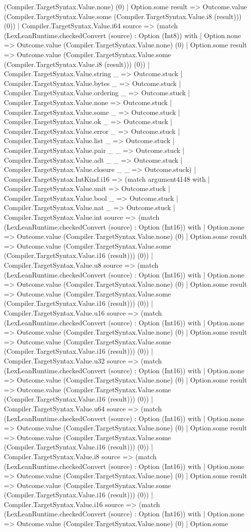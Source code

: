 \documentclass[11pt]{article}
\begin{document}
(Compiler.TargetSyntax.Value.none) (0) | Option.some result => Outcome.value (Compiler.TargetSyntax.Value.some (Compiler.TargetSyntax.Value.i8 (result))) (0)) | Compiler.TargetSyntax.Value.i64 source => (match (LexLeanRuntime.checkedConvert (source) : Option (Int8)) with | Option.none => Outcome.value (Compiler.TargetSyntax.Value.none) (0) | Option.some result => Outcome.value (Compiler.TargetSyntax.Value.some (Compiler.TargetSyntax.Value.i8 (result))) (0)) | Compiler.TargetSyntax.Value.string \_ => Outcome.stuck | Compiler.TargetSyntax.Value.bytes \_ => Outcome.stuck | Compiler.TargetSyntax.Value.ordering \_ => Outcome.stuck | Compiler.TargetSyntax.Value.none => Outcome.stuck | Compiler.TargetSyntax.Value.some \_ => Outcome.stuck | Compiler.TargetSyntax.Value.ok \_ => Outcome.stuck | Compiler.TargetSyntax.Value.error \_ => Outcome.stuck | Compiler.TargetSyntax.Value.list \_ => Outcome.stuck | Compiler.TargetSyntax.Value.pair \_ \_ => Outcome.stuck | Compiler.TargetSyntax.Value.adt \_ \_ => Outcome.stuck | Compiler.TargetSyntax.Value.closure \_ \_ => Outcome.stuck) | Compiler.TargetSyntax.IntKind.i16 => (match argument4148 with | Compiler.TargetSyntax.Value.unit => Outcome.stuck | Compiler.TargetSyntax.Value.bool \_ => Outcome.stuck | Compiler.TargetSyntax.Value.nat \_ => Outcome.stuck | Compiler.TargetSyntax.Value.int source => (match (LexLeanRuntime.checkedConvert (source) : Option (Int16)) with | Option.none => Outcome.value (Compiler.TargetSyntax.Value.none) (0) | Option.some result => Outcome.value (Compiler.TargetSyntax.Value.some (Compiler.TargetSyntax.Value.i16 (result))) (0)) | Compiler.TargetSyntax.Value.u8 source => (match (LexLeanRuntime.checkedConvert (source) : Option (Int16)) with | Option.none => Outcome.value (Compiler.TargetSyntax.Value.none) (0) | Option.some result => Outcome.value (Compiler.TargetSyntax.Value.some (Compiler.TargetSyntax.Value.i16 (result))) (0)) | Compiler.TargetSyntax.Value.u16 source => (match (LexLeanRuntime.checkedConvert (source) : Option (Int16)) with | Option.none => Outcome.value (Compiler.TargetSyntax.Value.none) (0) | Option.some result => Outcome.value (Compiler.TargetSyntax.Value.some (Compiler.TargetSyntax.Value.i16 (result))) (0)) | Compiler.TargetSyntax.Value.u32 source => (match (LexLeanRuntime.checkedConvert (source) : Option (Int16)) with | Option.none => Outcome.value (Compiler.TargetSyntax.Value.none) (0) | Option.some result => Outcome.value (Compiler.TargetSyntax.Value.some (Compiler.TargetSyntax.Value.i16 (result))) (0)) | Compiler.TargetSyntax.Value.u64 source => (match (LexLeanRuntime.checkedConvert (source) : Option (Int16)) with | Option.none => Outcome.value (Compiler.TargetSyntax.Value.none) (0) | Option.some result => Outcome.value (Compiler.TargetSyntax.Value.some (Compiler.TargetSyntax.Value.i16 (result))) (0)) | Compiler.TargetSyntax.Value.i8 source => (match (LexLeanRuntime.checkedConvert (source) : Option (Int16)) with | Option.none => Outcome.value (Compiler.TargetSyntax.Value.none) (0) | Option.some result => Outcome.value (Compiler.TargetSyntax.Value.some (Compiler.TargetSyntax.Value.i16 (result))) (0)) | Compiler.TargetSyntax.Value.i16 source => (match (LexLeanRuntime.checkedConvert (source) : Option (Int16)) with | Option.none => Outcome.value (Compiler.TargetSyntax.Value.none) (0) | Option.some 
\end{document}
